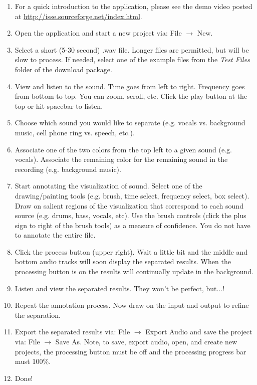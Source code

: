 \documentclass[11pt]{article}
\begin{document}
\begin{enumerate}
\item For a quick introduction to the application, please see the demo video posted at \newline  \textcolor{blue}{\url{http://isse.sourceforge.net/index.html}}. 
\item Open the application and start a new project via: File $\rightarrow$ New. 
\item Select a short (5-30 second) .wav file.  Longer files are permitted, but will be slow to process.  If needed, select  one of the example files from the \emph{Test Files} folder of the download package.
\item View and listen to the sound.  Time goes from left to right. Frequency goes from bottom to top. You can zoom, scroll, etc. Click the play button at the top or hit spacebar to listen.
\item Choose which sound you would like to separate (e.g. vocals vs. background music, cell phone ring vs. speech, etc.).
\item Associate one of the two colors from the top left to a given sound (e.g. vocals).  Associate the remaining color for the remaining sound in the recording (e.g. background music).
\item Start annotating the visualization of sound.  Select one of the drawing/painting tools (e.g. brush, time select, frequency select, box select).
Draw on salient regions of the visualization that correspond to each sound source (e.g. drums, bass, vocals, etc).  Use the brush controls (click the plus sign to right of the brush tools) as a measure of confidence. You do not have to annotate the entire file. 
\item Click the process button (upper right). Wait a little bit and the middle and bottom audio tracks will soon display the separated results. When the processing button is on the results will continually update in the background.
\item Listen and view the separated results. They won't be perfect, but...!
\item Repeat the annotation process.   Now draw on the input and output to refine the separation. 
\item Export the separated results via:  File $\rightarrow$ Export Audio and save the project via:  File $\rightarrow$ Save As.  Note, to save, export audio, open, and create new projects, the processing button must be off and the processing progress bar must 100\%.
\item Done!
\end{enumerate}
\end{document}
